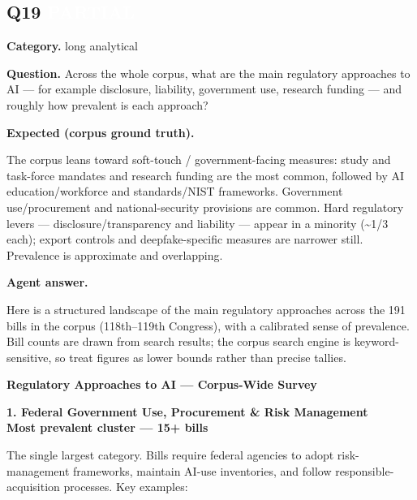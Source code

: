 \documentclass[11pt]{article}
\newcommand{\fieldlabel}[1]{\textbf{\color{navy}#1}\quad}
\begin{document}
\subsection*{Q19 \quad \colorbox{partialorange}{\textcolor{white}{\bfseries PARTIAL}}}
\fieldlabel{Category.} long analytical\par
\fieldlabel{Question.} Across the whole corpus, what are the main regulatory approaches to AI --- for example disclosure, liability, government use, research funding --- and roughly how prevalent is each approach?\par
\fieldlabel{Expected (corpus ground truth).}\par
The corpus leans toward soft-touch / government-facing measures: study and task-force mandates and research funding are the most common, followed by AI education/workforce and standards/NIST frameworks. Government use/procurement and national-security provisions are common. Hard regulatory levers --- disclosure/transparency and liability --- appear in a minority (\textasciitilde{}1/3 each); export controls and deepfake-specific measures are narrower still. Prevalence is approximate and overlapping.

\fieldlabel{Agent answer.}\par
Here is a structured landscape of the main regulatory approaches across the 191 bills in the corpus (118th--119th Congress), with a calibrated sense of prevalence. Bill counts are drawn from search results; the corpus search engine is keyword-sensitive, so treat figures as lower bounds rather than precise tallies.

\textbf{Regulatory Approaches to AI --- Corpus-Wide Survey}

\textbf{1. Federal Government Use, Procurement \& Risk Management} \\
\textbf{Most prevalent cluster --- 15+ bills}

The single largest category. Bills require federal agencies to adopt risk-management frameworks, maintain AI-use inventories, and follow responsible-acquisition processes. Key examples:
\end{document}
